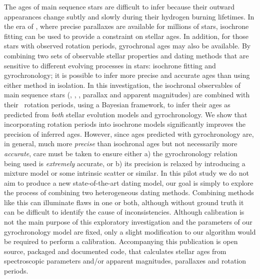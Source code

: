 
The ages of main sequence stars are difficult to infer because their outward
appearances change subtly and slowly during their hydrogen burning lifetimes.
In the era of \gaia, where precise parallaxes are available for millions of
stars, isochrone fitting can be used to provide a constraint on stellar ages.
In addition, for those stars with observed rotation periods, gyrochronal ages
may also be available.
By combining two sets of observable stellar properties and dating methods that
are sensitive to different evolving processes in stars: isochrone fitting and
gyrochronology; it is possible to infer more precise and accurate ages than
using either method in isolation.
In this investigation, the isochronal observables of main sequence stars
(\teff, \feh, \logg, parallax and apparent magnitudes) are combined with their
\kepler\ rotation periods, using a Bayesian framework, to infer their ages as
predicted from {\it both} stellar evolution models and gyrochronology.
We show that incorporating rotation periods into isochrone models
significantly improves the precision of inferred ages.
However, since ages predicted with gyrochronology are, in general, much more
{\it precise} than isochronal ages but not necessarily more {\it accurate},
care must be taken to ensure either a) the gyrochronology relation being used
is {\it extremely} accurate, or b) its precision is relaxed by introducing a
mixture model or some intrinsic scatter or similar.
In this pilot study we do not aim to produce a new state-of-the-art dating
model, our goal is simply to explore the process of combining two
heterogeneous dating methods.
Combining methods like this can illuminate flaws in one or both, although
without ground truth it can be difficult to identify the cause of
inconsistencies.
Although calibration is not the main purpose of this exploratory investigation
and the parameters of our gyrochronology model are fixed, only a slight
modification to our algorithm would be required to perform a calibration.
Accompanying this publication is open source, packaged and documented code,
that calculates stellar ages from spectroscopic parameters and/or apparent
magnitudes, parallaxes and rotation periods.

